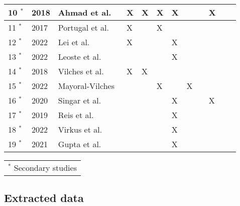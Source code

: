 \begin{table}[h!]
\begin{tabularx}{\textwidth}{|l|l|X|l|l|l|l|l|l|l|l|l|}
    10 $^{\ast}$ & 2018          & Ahmad et al.~\cite[]{analyzing_cyber_physical_threats_2018}                 & X          & X & X & X &  &  & X \\\hline
    11 $^{\ast}$ & 2017          & Portugal et al.~\cite[]{role_of_security_in_human_robot_2017}               & X &  & X &  &  &  &  \\\hline
    12 $^{\ast}$ & 2022          & Lei et al.~\cite[]{acceptance_telepresence_robots_2022}                     & X          &            &            & X          &  &  &  \\\hline
    13 $^{\ast}$ & 2022          & Leoste et al.~\cite[]{higher_edu_perception_on_tprs_2022}                   &            &            &            & X &  &  &  \\\hline
    14 $^{\ast}$ & 2018          & Vilches et al.~\cite[]{robot_security_framework_2018}                       & X          & X          &            &            &            &            &            \\\hline
    15 $^{\ast}$ & 2022          & Mayoral-Vilches~\cite[]{robot_security_review_2022}                         &            &            & X          &            & X          &            &            \\\hline
    16 $^{\ast}$ & 2020          & Singar et al.~\cite[]{role_of_cyber_security_in_higher_edu_2020} &  &  &  & X &  &  & X \\\hline
    17 $^{\ast}$ & 2019          & Reis et al.~\cite[]{telepresence_robots_in_classroom_2019}                  &            &            &            & X &  &  &  \\\hline
    18 $^{\ast}$ & 2022          & Virkus et al.~\cite[]{telepresence_perspective_psychology_educational_2022} &  &  &  & X &  &  &  \\\hline
    19 $^{\ast}$ & 2021          & Gupta et al.~\cite[]{humans_and_robots_relation_2021}                       &            &            &            & X          &            &            &            \\\hline

  \end{tabularx}
  \begin{tabularx}{\textwidth}{X}
    \footnotesize{$^{\ast}$ Secondary studies}\\
  \end{tabularx}
\end{table}

\newpage
\subsection{Extracted data}\label{subsec:extracted-data}


